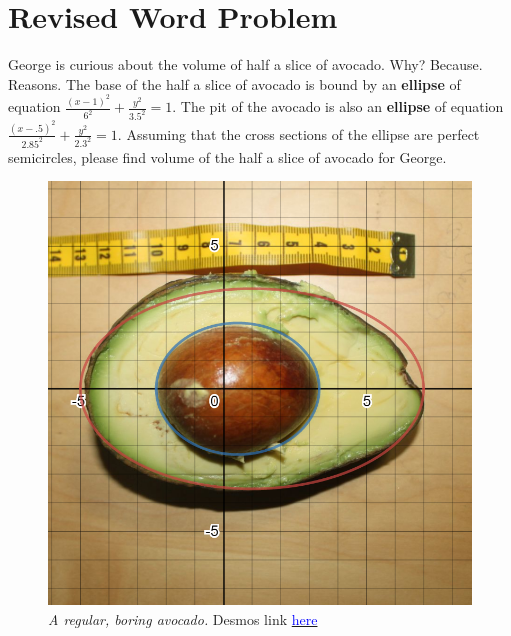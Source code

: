 \documentclass[letterpaper, 12pt]{article}
\begin{document}
\section{Revised Word Problem}
George is curious about the volume of half a slice of avocado. Why? Because. Reasons. The base of the half a slice of avocado is bound by an \textbf{ellipse} of equation $\frac{\left(x-1\right)^{2}}{6^{2}}+\frac{y^{2}}{3.5^{2}}=1$. The pit of the avocado is also an \textbf{ellipse} of equation $\frac{\left(x-.5\right)^{2}}{2.85^{2}}+\frac{y^{2}}{2.3^{2}}=1$. Assuming that the cross sections of the ellipse are perfect semicircles, please find volume of the half a slice of avocado for George.\par
\begin{figure}[h!]
    \begin{center}
        \includegraphics[scale=.2]{avocad.png}
        \caption{\textit{A regular, boring avocado.} Desmos link \href{https://www.desmos.com/calculator/i0kemx2ihg}{\textcolor{blue}{here}}}
    \end{center}
\end{figure}
\end{document}
